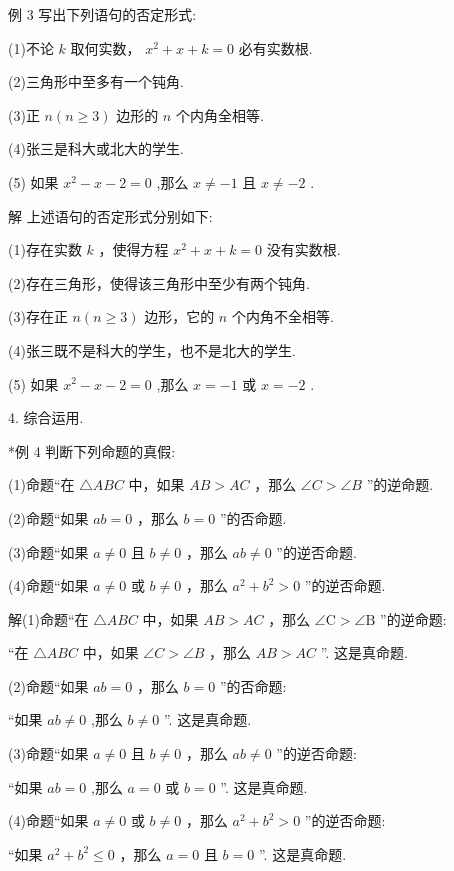 \documentclass[10pt]{article}
\begin{document}
例 3 写出下列语句的否定形式:

(1)不论 \(k\) 取何实数， \({x}^{2} + x + k = 0\) 必有实数根.

(2)三角形中至多有一个钝角.

(3)正 \(n\left( {n \geq  3}\right)\) 边形的 \(n\) 个内角全相等.

(4)张三是科大或北大的学生.

(5) 如果 \({x}^{2} - x - 2 = 0\) ,那么 \(x \neq   - 1\) 且 \(x \neq   - 2\) .

解 上述语句的否定形式分别如下:

(1)存在实数 \(k\) ，使得方程 \({x}^{2} + x + k = 0\) 没有实数根.

(2)存在三角形，使得该三角形中至少有两个钝角.

(3)存在正 \(n\left( {n \geq  3}\right)\) 边形，它的 \(n\) 个内角不全相等.

(4)张三既不是科大的学生，也不是北大的学生.

(5) 如果 \({x}^{2} - x - 2 = 0\) ,那么 \(x =  - 1\) 或 \(x =  - 2\) .

4. 综合运用.

*例 4 判断下列命题的真假:

(1)命题“在 \(\bigtriangleup  {ABC}\) 中，如果 \({AB} > {AC}\) ，那么 \({\angle C} > {\angle B}\) ”的逆命题.

(2)命题“如果 \({ab} = 0\) ，那么 \(b = 0\) ”的否命题.

(3)命题“如果 \(a \neq  0\) 且 \(b \neq  0\) ，那么 \({ab} \neq  0\) ”的逆否命题.

(4)命题“如果 \(a \neq  0\) 或 \(b \neq  0\) ，那么 \({a}^{2} + {b}^{2} > 0\) ”的逆否命题.

解(1)命题“在 \(\bigtriangleup  {ABC}\) 中，如果 \({AB} > {AC}\) ，那么 \(\mathrm{\angle C} > \mathrm{\angle B}\) ”的逆命题:

“在 \(\bigtriangleup  {ABC}\) 中，如果 \(\angle C > \angle B\) ，那么 \({AB} > {AC}\) ”. 这是真命题.

(2)命题“如果 \({ab} = 0\) ，那么 \(b = 0\) ”的否命题:

“如果 \({ab} \neq  0\) ,那么 \(b \neq  0\) ”. 这是真命题.

(3)命题“如果 \(a \neq  0\) 且 \(b \neq  0\) ，那么 \({ab} \neq  0\) ”的逆否命题:

“如果 \({ab} = 0\) ,那么 \(a = 0\) 或 \(b = 0\) ”. 这是真命题.

(4)命题“如果 \(a \neq  0\) 或 \(b \neq  0\) ，那么 \({a}^{2} + {b}^{2} > 0\) ”的逆否命题:

“如果 \({a}^{2} + {b}^{2} \leq  0\) ，那么 \(a = 0\) 且 \(b = 0\) ”. 这是真命题.
\end{document}
